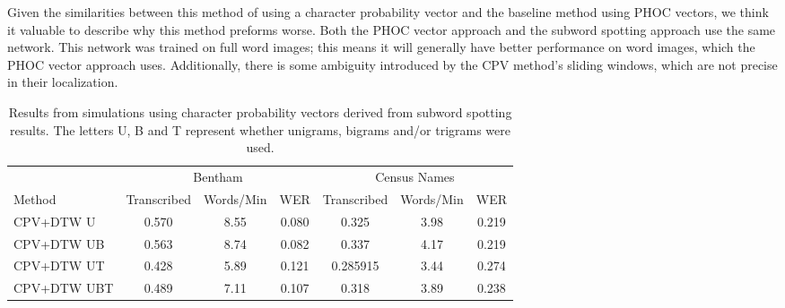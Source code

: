\documentclass[ms,electronic,twosidetoc,letterpaper,chaptercenter,parttop,lof,lot]{byumsphd}
\begin{document}
Given the similarities between this method of using a character probability vector and the baseline method using PHOC vectors, we think it valuable to describe why this method preforms worse.
Both the PHOC vector approach and the subword spotting approach use the same network.
This network was trained on full word images; this means it will generally have better performance on word images, which the PHOC vector approach uses. Additionally, there is some ambiguity introduced by the CPV method's sliding windows, which are not precise in their localization.


\begin{table}
\centering
\begin{tabular}{| l | c c c | c c c |}
  \hline
   & \multicolumn{3}{c|}{Bentham} & \multicolumn{3}{c|}{Census Names}\\
  Method & Transcribed & Words/Min & WER & Transcribed & Words/Min & WER\\
  \hline
  CPV+DTW U & 0.570 & 8.55 & 0.080 & 0.325 & 3.98 & 0.219  \\
  CPV+DTW UB & 0.563 & 8.74 & 0.082 & 0.337 & 4.17 & 0.219  \\
  CPV+DTW UT	 & 0.428 & 5.89 & 0.121 & 0.285915 & 3.44 & 0.274  \\
  CPV+DTW UBT & 0.489 & 7.11 & 0.107 & 0.318 & 3.89 & 0.238  \\
  \hline    
\end{tabular}
\caption{Results from simulations using character probability vectors derived from subword spotting results. The letters U, B and T represent whether unigrams, bigrams and/or trigrams were used.}
\label{tab:dtwresults}
\end{table}
\end{document}

